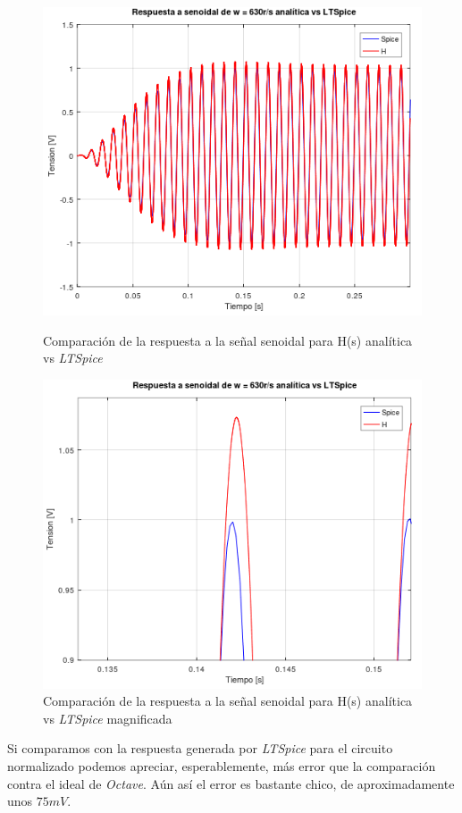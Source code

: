 \documentclass[11pt,a4paper]{report}
\begin{document}
\begin{figure}[ht!]
\centering
\includegraphics[scale=1]{rtaSenoidalAnaliticavsSpice.png}
\caption{Comparación de la respuesta a la señal senoidal para H(s) analítica vs \textit{LTSpice}}
\includegraphics[scale=0.9]{rtaSenoidalAnaliticavsSpiceMagnificada.png}
\caption{Comparación de la respuesta a la señal senoidal para H(s) analítica vs \textit{LTSpice} magnificada}
\end{figure}
\clearpage

Si comparamos con la respuesta generada por \textit{LTSpice} para el circuito normalizado podemos apreciar, esperablemente, más error que la comparación contra el ideal de \textit{Octave}. Aún así el error es bastante chico, de aproximadamente unos $75mV$.
\end{document}
